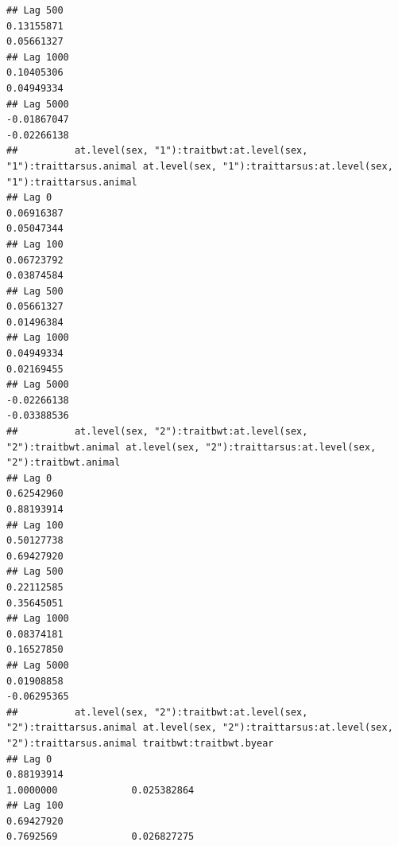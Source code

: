 \documentclass[
  12pt,
]{book}
\begin{document}
\begin{verbatim}
## Lag 500                                                      0.13155871                                                        0.05661327
## Lag 1000                                                     0.10405306                                                        0.04949334
## Lag 5000                                                    -0.01867047                                                       -0.02266138
##          at.level(sex, "1"):traitbwt:at.level(sex, "1"):traittarsus.animal at.level(sex, "1"):traittarsus:at.level(sex, "1"):traittarsus.animal
## Lag 0                                                           0.06916387                                                           0.05047344
## Lag 100                                                         0.06723792                                                           0.03874584
## Lag 500                                                         0.05661327                                                           0.01496384
## Lag 1000                                                        0.04949334                                                           0.02169455
## Lag 5000                                                       -0.02266138                                                          -0.03388536
##          at.level(sex, "2"):traitbwt:at.level(sex, "2"):traitbwt.animal at.level(sex, "2"):traittarsus:at.level(sex, "2"):traitbwt.animal
## Lag 0                                                        0.62542960                                                        0.88193914
## Lag 100                                                      0.50127738                                                        0.69427920
## Lag 500                                                      0.22112585                                                        0.35645051
## Lag 1000                                                     0.08374181                                                        0.16527850
## Lag 5000                                                     0.01908858                                                       -0.06295365
##          at.level(sex, "2"):traitbwt:at.level(sex, "2"):traittarsus.animal at.level(sex, "2"):traittarsus:at.level(sex, "2"):traittarsus.animal traitbwt:traitbwt.byear
## Lag 0                                                           0.88193914                                                            1.0000000             0.025382864
## Lag 100                                                         0.69427920                                                            0.7692569             0.026827275

\end{verbatim}
\end{document}
